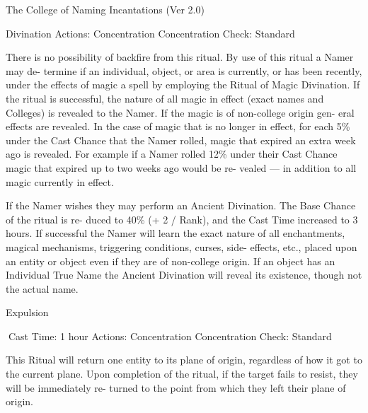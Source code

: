 \begin{Chapter}{The College of Naming Incantations (Ver 2.0)}
\begin{ritual}[R-1]{Divination }
Actions: Concentration 
Concentration Check: Standard 
\begin{effects}
 There  is  no  possibility  of  backfire  from 
this  ritual.  By  use  of  this  ritual  a  Namer  may  de-
termine if an individual, object, or area is currently, 
or  has  been  recently,  under  the  effects  of  magic  a 
spell by employing the Ritual of Magic Divination. 
If the ritual is successful, the nature of all magic in 
effect (exact names and Colleges) is revealed to the 
Namer.  If  the  magic  is  of  non-college  origin  gen-
eral  effects  are  revealed.  In  the  case  of  magic  that 
is  no  longer  in  effect,  for  each  5\%  under  the  Cast 
Chance  that  the  Namer  rolled,  magic  that  expired 
an  extra  week  ago  is  revealed.  For  example  if  a 
Namer  rolled  12\%  under  their  Cast  Chance  magic 
that  expired  up  to  two  weeks  ago  would  be  re-
vealed  —  in  addition  to  all  magic  currently  in 
effect. 

If the Namer wishes they may perform an Ancient 
Divination.  The  Base  Chance  of  the  ritual  is  re-
duced  to  40\%  (+  2  /  Rank),  and  the  Cast  Time 
increased  to  3  hours.  If  successful  the  Namer  will 
learn the exact nature of all enchantments, magical 
mechanisms,  triggering  conditions,  curses,  side-
effects, etc., placed upon an entity or object even if 
they  are  of  non-college  origin.  If  an  object  has  an 
Individual  True  Name  the  Ancient  Divination  will 
reveal its existence, though not the actual name. 

\end{effects}
\end{ritual}

\begin{ritual}[R-2]{Expulsion }


Cast Time: 1 hour 
Actions: Concentration 
Concentration Check: Standard 
\begin{effects}
 This  Ritual  will  return  one  entity  to  its 
plane  of  origin,  regardless  of  how  it  got  to  the 
current plane. Upon completion of the ritual, if the 
target  fails  to  resist,  they  will  be  immediately  re-
turned to the point from which they left their plane 
of origin. 


\end{effects}
\end{ritual}
\end{Chapter}
